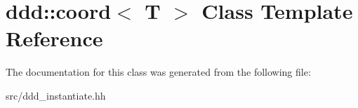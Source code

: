 \hypertarget{classddd_1_1coord}{}\section{ddd\+:\+:coord$<$ T $>$ Class Template Reference}
\label{classddd_1_1coord}


The documentation for this class was generated from the following file\+:\begin{DoxyCompactItemize}
\item 
src/ddd\+\_\+instantiate.\+hh\end{DoxyCompactItemize}
